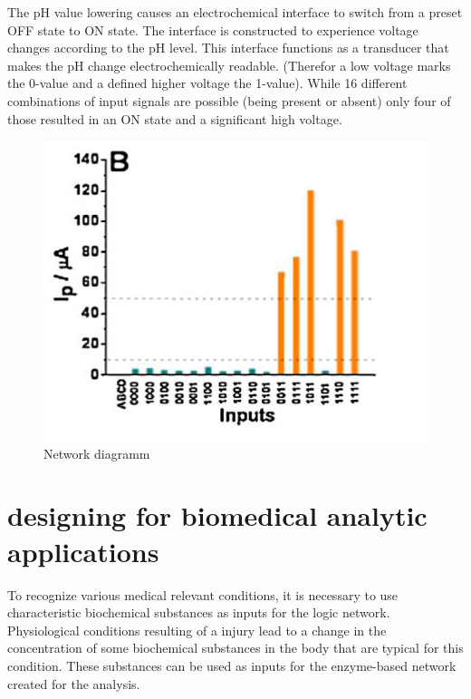 \documentclass[runningheads]{llncs}
\begin{document}
	
		The pH value lowering causes an electrochemical interface to switch from a preset OFF state to ON state. The interface is constructed to experience voltage changes according to the pH level. This interface functions as a transducer that makes the pH change electrochemically readable. (Therefor a low voltage marks the 0-value and a defined higher voltage the 1-value). While 16 different combinations of input signals are possible (being present or absent) only four of those resulted in an ON state and a significant high voltage. \cite{original}
		
		\begin{figure}[H] \centering \includegraphics[scale= 0.4]{pics/ph.png} \caption{Network diagramm} \label{img:ph} \end{figure}
	
	



\section{designing for biomedical analytic applications}
	To recognize various medical relevant conditions, it is necessary to use characteristic biochemical substances as inputs for the logic network.
	Physiological conditions resulting of a injury lead to a change in the concentration of some biochemical substances in the body that are typical for this condition. These substances can be used as inputs for the enzyme-based network created for the analysis.
	
\end{document}
